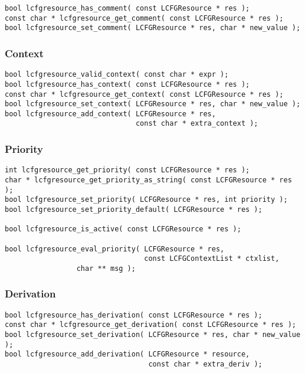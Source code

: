 \documentclass[11pt,a4paper,titlepage]{article}
\begin{document}
\begin{verbatim}
bool lcfgresource_has_comment( const LCFGResource * res );
const char * lcfgresource_get_comment( const LCFGResource * res );
bool lcfgresource_set_comment( LCFGResource * res, char * new_value );
\end{verbatim}

\subsubsection{Context}
\label{subsec:res_context}

\begin{verbatim}
bool lcfgresource_valid_context( const char * expr );
bool lcfgresource_has_context( const LCFGResource * res );
const char * lcfgresource_get_context( const LCFGResource * res );
bool lcfgresource_set_context( LCFGResource * res, char * new_value );
bool lcfgresource_add_context( LCFGResource * res,
                               const char * extra_context );
\end{verbatim}

\subsubsection{Priority}
\label{subsec:res_priority}

\begin{verbatim}
int lcfgresource_get_priority( const LCFGResource * res );
char * lcfgresource_get_priority_as_string( const LCFGResource * res );
bool lcfgresource_set_priority( LCFGResource * res, int priority );
bool lcfgresource_set_priority_default( LCFGResource * res );

bool lcfgresource_is_active( const LCFGResource * res );

bool lcfgresource_eval_priority( LCFGResource * res,
                                 const LCFGContextList * ctxlist,
				 char ** msg );
\end{verbatim}

\subsubsection{Derivation}
\label{subsec:res_derivation}

\begin{verbatim}
bool lcfgresource_has_derivation( const LCFGResource * res );
const char * lcfgresource_get_derivation( const LCFGResource * res );
bool lcfgresource_set_derivation( LCFGResource * res, char * new_value );
bool lcfgresource_add_derivation( LCFGResource * resource,
                                  const char * extra_deriv );
\end{verbatim}
\end{document}
